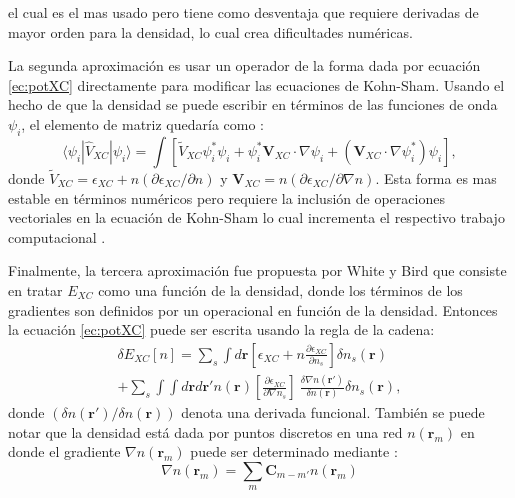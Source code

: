    el cual es el mas usado pero tiene como desventaja que requiere derivadas de mayor orden para la densidad, lo cual crea dificultades num\'ericas.
   \newline
   \par La segunda aproximaci\'on es usar un operador de la forma dada por ecuaci\'on \ref{ec:potXC} directamente para modificar las ecuaciones de Kohn-Sham. Usando el hecho de que la densidad se puede escribir en t\'erminos de las funciones de onda $\psi_i$, el elemento de matriz quedar\'ia como \cite{PhysRevLett.76.660}:
   \begin{equation}
   \langle \psi_i |\hat{V}_{XC}| \psi_i \rangle = \int \left[\tilde{V}_{XC} \psi_i ^* \psi_i + \psi_i ^* \pmb{V}_{XC} \cdot \nabla \psi_i + (\pmb{V}_{XC} \cdot \nabla \psi_i^*) \psi_i \right], \label{ec:potXC_3}
   \end{equation}
   donde $\tilde{V}_{XC} = \epsilon_{XC} + n (\partial \epsilon_{XC}/ \partial n)$ y $\pmb{V}_{XC} = n (\partial \epsilon_{XC} / \partial \nabla n) $. Esta forma es mas estable en t\'erminos num\'ericos pero requiere la inclusi\'on de operaciones vectoriales en la ecuaci\'on de Kohn-Sham lo cual incrementa  el respectivo trabajo computacional \cite{Martin-2004}.
   \newline
   \par Finalmente, la tercera aproximaci\'on fue propuesta por White y Bird \cite{PhysRevB.50.4954} que consiste en tratar $E_{XC}$ como una funci\'on de la densidad, donde los t\'erminos de  los gradientes son definidos por un operacional en funci\'on de la densidad. Entonces la ecuaci\'on \ref{ec:potXC} puede ser escrita usando la regla de la cadena:
   \begin{multline}
   \delta E_{XC} [n] = \sum_{s} \int d \pmb{r} \left[\epsilon_{XC} + n \frac{\partial \epsilon_{XC}}{\partial n_s} \right] \delta n_s (\pmb{r}) \\
   + \sum_{s}  \int\int d  \pmb{r} d \pmb{r'} n(\pmb{r}) \left[\frac{\partial \epsilon_{XC}}{\partial \nabla n_s} \right] ~ \frac{\delta \nabla n(\pmb{r'})}{\delta n(\pmb{r})} \delta n_s (\pmb{r}), \label{ec:potXC_4}
   \end{multline}
   donde $ (\delta n(\pmb{r'})/\delta n(\pmb{r}))$ denota una derivada funcional. Tambi\'en se puede notar que la densidad est\'a dada por puntos discretos en una red $n(\pmb{r}_m)$ en donde el gradiente $\nabla n(\pmb{r}_m) $ puede ser  determinado mediante \cite{PhysRevB.50.4954}:
   \begin{equation}
   	\nabla n(\pmb{r}_m)= \sum_{m} \pmb{C}_{m-m'} n(\pmb{r}_m) \label{ec:gradDisc}
   \end{equation}  
